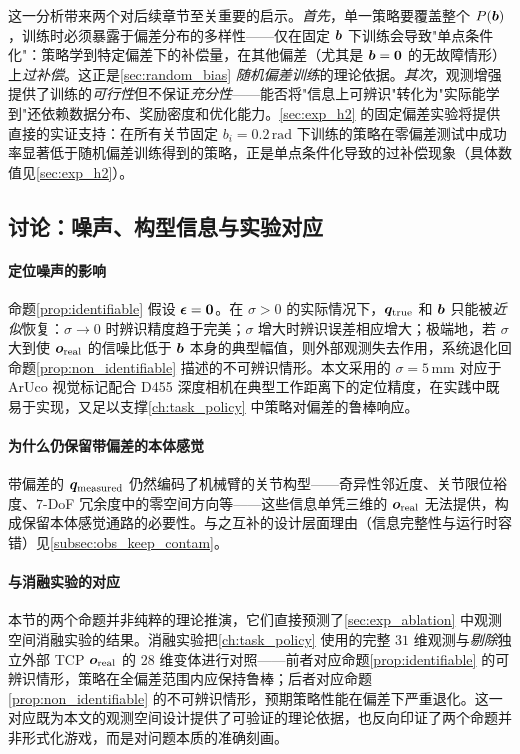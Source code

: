这一分析带来两个对后续章节至关重要的启示。\emph{首先}，单一策略要覆盖整个 $P(\bm{b})$，训练时必须暴露于偏差分布的多样性——仅在固定 $\bm{b}$ 下训练会导致"单点条件化"：策略学到特定偏差下的补偿量，在其他偏差（尤其是 $\bm{b}=\bm{0}$ 的无故障情形）上\emph{过补偿}。这正是\cref{sec:random_bias} \emph{随机偏差训练}的理论依据。\emph{其次}，观测增强提供了训练的\emph{可行性}但不保证\emph{充分性}——能否将"信息上可辨识"转化为"实际能学到"还依赖数据分布、奖励密度和优化能力。\cref{sec:exp_h2} 的固定偏差实验将提供直接的实证支持：在所有关节固定 $b_i = 0.2\,\text{rad}$ 下训练的策略在零偏差测试中成功率显著低于随机偏差训练得到的策略，正是单点条件化导致的过补偿现象（具体数值见\cref{sec:exp_h2}）。

\subsection{讨论：噪声、构型信息与实验对应}\label{subsec:observability_discussion}

\paragraph{定位噪声的影响} 命题\ref{prop:identifiable} 假设 $\bm{\epsilon} = \bm{0}$。在 $\sigma > 0$ 的实际情况下，$\bm{q}_{\text{true}}$ 和 $\bm{b}$ 只能被\emph{近似}恢复：$\sigma \to 0$ 时辨识精度趋于完美；$\sigma$ 增大时辨识误差相应增大；极端地，若 $\sigma$ 大到使 $\bm{o}_{\text{real}}$ 的信噪比低于 $\bm{b}$ 本身的典型幅值，则外部观测失去作用，系统退化回命题\ref{prop:non_identifiable} 描述的不可辨识情形。本文采用的 $\sigma = 5$\,mm 对应于 ArUco 视觉标记配合 D455 深度相机在典型工作距离下的定位精度，在实践中既易于实现，又足以支撑\cref{ch:task_policy} 中策略对偏差的鲁棒响应。

\paragraph{为什么仍保留带偏差的本体感觉} 带偏差的 $\bm{q}_{\text{measured}}$ 仍然编码了机械臂的关节构型——奇异性邻近度、关节限位裕度、$7$-DoF 冗余度中的零空间方向等——这些信息单凭三维的 $\bm{o}_{\text{real}}$ 无法提供，构成保留本体感觉通路的必要性。与之互补的设计层面理由（信息完整性与运行时容错）见\cref{subsec:obs_keep_contam}。

\paragraph{与消融实验的对应} 本节的两个命题并非纯粹的理论推演，它们直接预测了\cref{sec:exp_ablation} 中观测空间消融实验的结果。消融实验把\cref{ch:task_policy} 使用的完整 $31$ 维观测与\emph{剔除}独立外部 TCP $\bm{o}_\text{real}$ 的 $28$ 维变体进行对照——前者对应命题\ref{prop:identifiable} 的可辨识情形，策略在全偏差范围内应保持鲁棒；后者对应命题\ref{prop:non_identifiable} 的不可辨识情形，预期策略性能在偏差下严重退化。这一对应既为本文的观测空间设计提供了可验证的理论依据，也反向印证了两个命题并非形式化游戏，而是对问题本质的准确刻画。

